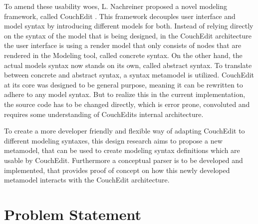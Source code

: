 \documentclass[10pt,a4paper,oneside]{scrartcl}
\newcommand\hint[2]{
\ifthenelse{\boolean{showhints}}{
\begin{center}
\colorbox{black!10}{
\begin{minipage}{.963\textwidth}
#2\hfill\textbf{#1}
\end{minipage}
}\end{center}}{}
}
\begin{document}
To amend these usability woes, L. Nachreiner proposed a novel modeling framework, called CouchEdit \cite{nachreiner_couchedit_2020}. This framework decouples user interface and model syntax by introducing different models for both. Instead of relying directly on the syntax of the model that is being designed, in the CouchEdit architecture the user interface is using a render model that only consists of nodes that are rendered in the Modeling tool, called concrete syntax. On the other hand, the actual models syntax now stands on its own, called abstract syntax. To translate between concrete and abstract syntax, a syntax metamodel is utilized. CouchEdit at its core was designed to be general purpose, meaning it can be rewritten to adhere to any model syntax. But to realize this in the current implementation, the source code has to be changed directly, which is error prone, convoluted and requires some understanding of CouchEdits internal architecture.

To create a more developer friendly and flexible way of adapting CouchEdit to different modeling syntaxes, this design research aims to propose a new metamodel, that can be used to create modeling syntax definitions which are usable by CouchEdit. Furthermore a conceptual parser is to be developed and implemented, that provides proof of concept on how this newly developed metamodel interacts with the CouchEdit architecture.

\section{Problem Statement}
\label{sec:problem_statement}


\end{document}
